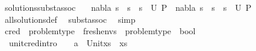 \begin{isabellebody}
%
\endisadelimproof
\isanewline
{}\isamarkupfalse%
\ solutions{\isacharunderscore}{\kern0pt}subst{\isacharunderscore}{\kern0pt}assoc{\isacharcolon}{\kern0pt}\isanewline
\ \ \ {\isachardoublequoteopen}{\isacharparenleft}{\kern0pt}{\isacharparenleft}{\kern0pt}nabla{\isacharcomma}{\kern0pt}\ s{}\ {\isasymbullet}\ {\isacharparenleft}{\kern0pt}s{}\ {\isasymbullet}\ s{}{\isacharparenright}{\kern0pt}{\isacharparenright}{\kern0pt}\ {\isasymin}\ U\ P{\isacharparenright}{\kern0pt}\ {\isacharequal}{\kern0pt}\ {\isacharparenleft}{\kern0pt}{\isacharparenleft}{\kern0pt}nabla{\isacharcomma}{\kern0pt}\ {\isacharparenleft}{\kern0pt}s{}\ {\isasymbullet}\ s{}{\isacharparenright}{\kern0pt}\ {\isasymbullet}\ s{}{\isacharparenright}{\kern0pt}\ {\isasymin}\ U\ P{\isacharparenright}{\kern0pt}{\isachardoublequoteclose}\isanewline
%
\isadelimproof
\ \ %
\endisadelimproof
%
\isatagproof
{}\isamarkupfalse%
\ all{\isacharunderscore}{\kern0pt}solutions{\isacharunderscore}{\kern0pt}def\ \isamarkupfalse%
\ subst{\isacharunderscore}{\kern0pt}assoc\ \isamarkupfalse%
\ simp%
\endisatagproof
{\isafoldproof}%
%
\isadelimproof
\isanewline
%
\endisadelimproof
\isanewline
\isanewline
\isanewline
{}\isamarkupfalse%
\ c{\isacharunderscore}{\kern0pt}red\ {\isacharcolon}{\kern0pt}{\isacharcolon}{\kern0pt}\ {\isachardoublequoteopen}problem{\isacharunderscore}{\kern0pt}type\ {\isasymRightarrow}\ fresh{\isacharunderscore}{\kern0pt}envs\ {\isasymRightarrow}\ problem{\isacharunderscore}{\kern0pt}type\ {\isasymRightarrow}\ bool{\isachardoublequoteclose}\ {\isacharparenleft}{\kern0pt}{\isachardoublequoteopen}{\isacharunderscore}{\kern0pt}\ {\isasymturnstile}\ {\isacharunderscore}{\kern0pt}\ {\isasymrightarrow}\ {\isacharunderscore}{\kern0pt}\ {\isachardoublequoteclose}\ {\isacharbrackleft}{\kern0pt}{}{}{\isacharcomma}{\kern0pt}{}{}{\isacharcomma}{\kern0pt}{}{}{\isacharbrackright}{\kern0pt}\ {}{}{\isacharparenright}{\kern0pt}\isanewline
\ \ \isanewline
\ \ unit{\isacharunderscore}{\kern0pt}cred{\isacharbrackleft}{\kern0pt}intro{\isacharbang}{\kern0pt}{\isacharbrackright}{\kern0pt}{\isacharcolon}{\kern0pt}\ \ \ \ {\isachardoublequoteopen}{\isacharparenleft}{\kern0pt}{\isacharbrackleft}{\kern0pt}{\isacharbrackright}{\kern0pt}{\isacharcomma}{\kern0pt}{\isacharparenleft}{\kern0pt}a\ {\isasymsharp}{\isacharquery}{\kern0pt}\ Unit{\isacharparenright}{\kern0pt}{\isacharhash}{\kern0pt}xs{\isacharparenright}{\kern0pt}\ {\isasymturnstile}{\isacharbraceleft}{\kern0pt}{\isacharbraceright}{\kern0pt}{\isasymrightarrow}\ {\isacharparenleft}{\kern0pt}{\isacharbrackleft}{\kern0pt}{\isacharbrackright}{\kern0pt}{\isacharcomma}{\kern0pt}xs{\isacharparenright}{\kern0pt}{\isachardoublequoteclose}\ {\isacharbar}{\kern0pt}\isanewline

\end{isabellebody}
